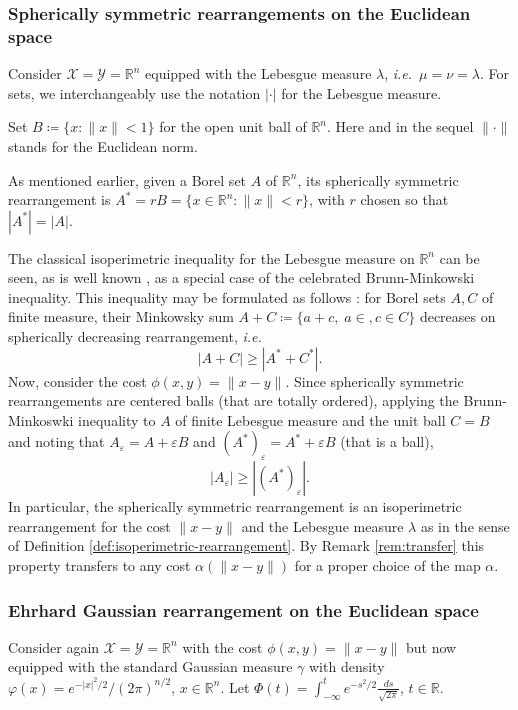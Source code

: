 \documentclass[11pt]{article}
\newcommand{\1}{[1]}
\begin{document}
\subsubsection*{Spherically symmetric rearrangements on the Euclidean space}
Consider $\mathcal{X}=\mathcal{Y}=\mathbb{R}^n$ equipped with the Lebesgue measure $\lambda$, \textit{i.e.}\ $\mu=\nu=\lambda$. For sets, we interchangeably use the notation $|\cdot|$ for the Lebesgue measure.

Set $B \coloneqq \{ x : \|x\| < 1 \}$ for the open unit ball of $\mathbb{R}^n$. Here and in the sequel $\|\cdot\|$ stands for the Euclidean norm.

As mentioned earlier, given a Borel set $A$ of $\mathbb{R}^n$, its spherically symmetric rearrangement is $A^*=rB=\{x \in \mathbb{R}^n : \|x\| < r\}$, with $r$ chosen so that $|A^*|=|A|$. 

The classical isoperimetric inequality for the Lebesgue measure on $\mathbb{R}^n$ can be seen, as is well known \cite{ledoux}, as a special case of the celebrated Brunn-Minkowski inequality. This inequality may be formulated as follows \cite{gardner}: for Borel sets $A,C$ of finite measure, their Minkowsky sum $A+C \coloneqq \{a+c, \; a \in , c \in C\}$ decreases on spherically decreasing rearrangement, \textit{i.e.}\ 
$$
|A+C| \geq |A^*+C^*|.
$$
Now, consider the cost $\phi(x,y)=\|x-y\|$.
Since spherically symmetric rearrangements are centered balls (that are totally ordered), applying the Brunn-Minkoswki inequality
to $A$ of finite Lebesgue measure and the unit ball $C=B$ and noting that 
$A_\varepsilon = A + \varepsilon B$
and
$(A^*)_\varepsilon = A^* + \varepsilon B$ (that is a ball), 
$$
|A_\varepsilon| \geq |(A^*)_\varepsilon |.
$$
In particular, the spherically symmetric rearrangement is an isoperimetric rearrangement for the cost $\|x-y\|$ and the Lebesgue measure $\lambda$ as in the sense of Definition \ref{def:isoperimetric-rearrangement}.
By Remark \ref{rem:transfer} this property transfers to any cost $\alpha(\|x-y\|)$ for a proper choice of the map $\alpha$.

\subsubsection*{Ehrhard Gaussian rearrangement on the Euclidean space}
Consider again $\mathcal{X}=\mathcal{Y}=\mathbb{R}^n$ with the cost $\phi(x,y)=\|x-y\|$ but now equipped with the standard Gaussian measure  $\gamma$ with density $\varphi(x)=e^{-|x|^2/2}/(2\pi)^{n/2}$, $x \in \mathbb{R}^n$. Let $\Phi(t)=\int_{-\infty}^t e^{-s^2/2}\frac{ds}{\sqrt{2\pi}}$, $t \in \mathbb{R}$. 
\end{document}
